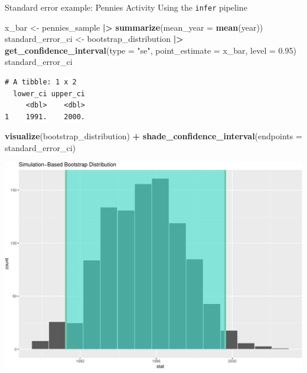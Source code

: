 \documentclass[
  ignorenonframetext,
]{beamer}
\newenvironment{Shaded}{\begin{snugshade}}{\end{snugshade}}
\newcommand{\AttributeTok}[1]{\textcolor[rgb]{0.13,0.29,0.53}{#1}}
\newcommand{\FloatTok}[1]{\textcolor[rgb]{0.00,0.00,0.81}{#1}}
\newcommand{\FunctionTok}[1]{\textcolor[rgb]{0.13,0.29,0.53}{\textbf{#1}}}
\newcommand{\NormalTok}[1]{#1}
\newcommand{\OtherTok}[1]{\textcolor[rgb]{0.56,0.35,0.01}{#1}}
\newcommand{\SpecialCharTok}[1]{\textcolor[rgb]{0.81,0.36,0.00}{\textbf{#1}}}
\newcommand{\StringTok}[1]{\textcolor[rgb]{0.31,0.60,0.02}{#1}}
\begin{document}
\begin{frame}[fragile]{Standard error example: Pennies Activity}
\protect\hypertarget{standard-error-example-pennies-activity}{}
Using the \texttt{infer} pipeline

\tiny

\begin{Shaded}
\begin{Highlighting}[]
\NormalTok{x\_bar }\OtherTok{\textless{}{-}}\NormalTok{ pennies\_sample }\SpecialCharTok{|\textgreater{}} \FunctionTok{summarize}\NormalTok{(}\AttributeTok{mean\_year =} \FunctionTok{mean}\NormalTok{(year))}
\NormalTok{standard\_error\_ci }\OtherTok{\textless{}{-}}\NormalTok{ bootstrap\_distribution }\SpecialCharTok{|\textgreater{}} 
  \FunctionTok{get\_confidence\_interval}\NormalTok{(}\AttributeTok{type =} \StringTok{"se"}\NormalTok{, }\AttributeTok{point\_estimate =}\NormalTok{ x\_bar, }\AttributeTok{level =} \FloatTok{0.95}\NormalTok{)}
\NormalTok{standard\_error\_ci}
\end{Highlighting}
\end{Shaded}

\begin{verbatim}
# A tibble: 1 x 2
  lower_ci upper_ci
     <dbl>    <dbl>
1    1991.    2000.
\end{verbatim}

\begin{Shaded}
\begin{Highlighting}[]
\FunctionTok{visualize}\NormalTok{(bootstrap\_distribution) }\SpecialCharTok{+} 
  \FunctionTok{shade\_confidence\_interval}\NormalTok{(}\AttributeTok{endpoints =}\NormalTok{ standard\_error\_ci)}
\end{Highlighting}
\end{Shaded}

\begin{center}\includegraphics[width=0.7\linewidth,height=0.4\textheight]{Week10_Lect_files/figure-beamer/unnamed-chunk-18-1} \end{center}
\normalsize
\end{frame}
\end{document}
